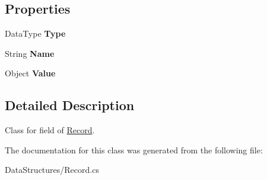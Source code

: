 \subsection*{Properties}
\begin{DoxyCompactItemize}
\item 
\hypertarget{class_dwarf_d_b_1_1_data_structures_1_1_field_a147e0dff27a89485bf91437d931fe5b5}{
DataType {\bfseries Type}}
\label{class_dwarf_d_b_1_1_data_structures_1_1_field_a147e0dff27a89485bf91437d931fe5b5}

\item 
\hypertarget{class_dwarf_d_b_1_1_data_structures_1_1_field_a5c1af79be209e13f5da11e4c033f1fdb}{
String {\bfseries Name}}
\label{class_dwarf_d_b_1_1_data_structures_1_1_field_a5c1af79be209e13f5da11e4c033f1fdb}

\item 
\hypertarget{class_dwarf_d_b_1_1_data_structures_1_1_field_ac7d7ebd43b9010ed2a7767a296e90d6f}{
Object {\bfseries Value}}
\label{class_dwarf_d_b_1_1_data_structures_1_1_field_ac7d7ebd43b9010ed2a7767a296e90d6f}

\end{DoxyCompactItemize}


\subsection{Detailed Description}
Class for field of \hyperlink{class_dwarf_d_b_1_1_data_structures_1_1_record}{Record}. 

The documentation for this class was generated from the following file:\begin{DoxyCompactItemize}
\item 
DataStructures/Record.cs\end{DoxyCompactItemize}
